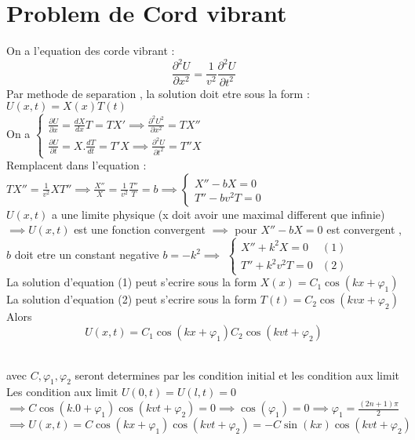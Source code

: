 \documentclass[12pt]{book}
\begin{document}
        \section{Problem de Cord vibrant}
            On a l'equation des corde vibrant : 
            \[ \frac{\partial^2U}{\partial x^2} = \frac{1}{v^2}\frac{\partial^2U}{\partial t^2} \]
            Par methode de separation , la solution doit etre sous la form : $ U(x,t) = X(x)T(t) $ \\
            On a $ \begin{cases} \frac{\partial U}{\partial x} = \frac{dX}{dx}T =TX'\implies\frac{\partial^2U^2}{\partial x^2}=TX'' \\ \frac{\partial U}{\partial t} = X.\frac{dT}{dt} = T'X \implies \frac{\partial^2 U}{\partial t^2}=T''X\end{cases} $ \\
            Remplacent dans l'equation : $ TX'' = \frac{1}{v^2}XT'' \implies \frac{X''}{X}=\frac{1}{v^2}\frac{T''}{T}= b \implies \begin{cases}  X''-bX=0 \\ T''-bv^2T=0\end{cases}$ \\
            $ U(x,t) $ a une limite physique (x doit avoir une maximal different que infinie) \\
            $ \implies U(x,t) $ est une fonction convergent $\implies $ pour $X'' -bX =0 $  est convergent ,\\
            $b$ doit etre un constant negative $b = -k^2 \implies$ $\begin{cases}  X''+k^2X=0  & (1)\\ T''+k^2v^2T=0 & (2)\end{cases}$\\
            La solution d'equation (1) peut s'ecrire sous la form $X(x) =C_1\cos(kx+\varphi_1)$\\
            La solution d'equation (2) peut s'ecrire sous la form $T(t) =C_2\cos(kvx+\varphi_2)$ \\
            Alors \[ U(x,t) = C_1\cos(kx+\varphi_1)C_2\cos(kvt+\varphi_2) \] \\
            \begin{center}
            \end{center}
            avec $C,\varphi_1,\varphi_2 $ seront determines par les condition initial et les condition aux limit \\
            Les condition aux limit $U(0,t) = U(l,t) =0$ \\
            $ \implies C\cos(k.0+\varphi_1)\cos(kvt+\varphi_2) = 0 \implies \cos(\varphi_1) =0 \implies \varphi_1 = \frac{(2n+1)\pi}{2}$\\
            $ \implies U(x,t) = C\cos(kx+\varphi_1)\cos(kvt+\varphi_2)=-C\sin(kx)\cos(kvt+\varphi_2) $

            
            

            



            
            
            



        
            
\end{document}

